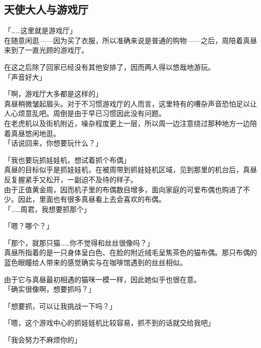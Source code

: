 \subsection{天使大人与游戏厅}

「……这里就是游戏厅」\\

在随意闲逛——因为买了衣服，所以准确来说是普通的购物——之后，周陪着真昼来到了一直光顾的游戏厅。

在这之后除了回家已经没有其他安排了，因而两人得以悠哉地游玩。\\

「声音好大」

「啊，游戏厅大多都是这样的」\\

真昼稍微皱起眉头。对于不习惯游戏厅的人而言，这里特有的嘈杂声音恐怕足以让人心烦意乱吧。周倒是由于早已习惯因此没有问题。\\

在老虎机以及街机附近，噪杂程度更上一层，所以周一边注意绕过那种地方一边陪着真昼悠闲地逛。\\

「话说回来，你想要玩什么？」

「我也要玩抓娃娃机，想试着抓个布偶」\\

真昼的目标似乎是抓娃娃机，在被周带到抓娃娃机区域，见到那里的机台后，真昼反复握紧手又松开，一副迫不及待的样子。\\

由于正值黄金周，因而机子里的布偶数目增多，面向家庭的可爱布偶也购进了不少。因此，里面也有很多真昼看上去会喜欢的布偶。\\

「……周君，我想要抓那个」

「嗯？哪个？」

「那个，就那只猫……你不觉得和丝丝很像吗？」\\

真昼所指着的是一只身体呈白色、在脸的附近绒毛呈焦茶色的猫布偶。那只布偶的蓝色眼瞳给人带来的感觉确实与在咖啡馆遇到的丝丝相似。

由于它与真昼最初相遇的猫咪一模一样，因此她似乎也很在意。\\

「确实很像啊，想要抓吗？」

「想要抓，可以让我挑战一下吗？」

「嗯，这个游戏中心的抓娃娃机比较容易，抓不到的话就交给我吧」

「我会努力不麻烦你的」\\

